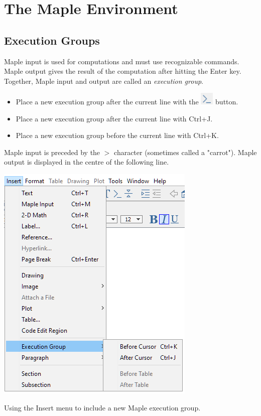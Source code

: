 \chapter{The Maple Environment}
\label{chp:maple_environment}			

\section{Execution Groups}

Maple input is used for computations and must use recognizable commands. Maple output gives the result of the computation after hitting the Enter key. Together, Maple input and output are called an \textit{execution group}.
\begin{itemize}
\item Place a new execution group after the current line with the \includegraphics[width=0.05\textwidth]{tutorials/figures/new_input.PNG} button.
\item Place a new execution group after the current line with Ctrl+J.
\item Place a new execution group before the current line with Ctrl+K.
\end{itemize}
Maple input is preceded by the $>$ character (sometimes called a "carrot"). Maple output is displayed in the centre of the following line.

\begin{marginfigure}
\includegraphics[scale=0.5]{tutorials/figures/InsertInput.png}
\caption{Using the Insert menu to include a new Maple execution group.}
\end{marginfigure}

